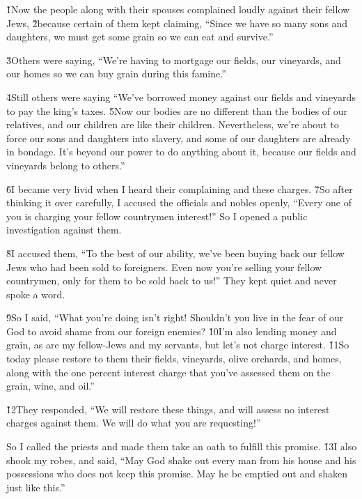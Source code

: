 \v{1}Now the people along with their spouses complained loudly against their fellow Jews, \v{2}because certain of them kept claiming, ``Since we have so many sons and daughters, we must get some grain so we can eat and survive.''

\v{3}Others were saying, ``We're having to mortgage our fields, our vineyards, and our homes so we can buy grain during this famine.''

\v{4}Still others were saying ``We've borrowed money against our fields and vineyards to pay the king's taxes. \v{5}Now our bodies are no different than the bodies of our relatives, and our children are like their children. Nevertheless, we're about to force our sons and daughters into slavery, and some of our daughters are already in bondage. It's beyond our power to do anything about it, because our fields and vineyards belong to others.''

\v{6}I became very livid when I heard their complaining and these charges. \v{7}So after thinking it over carefully, I accused the officials and nobles openly, ``Every one of you is charging your fellow countrymen interest!'' So I opened a public investigation against them.

\v{8}I accused them, ``To the best of our ability, we've been buying back our fellow Jews who had been sold to foreigners. Even now you're selling your fellow countrymen, only for them to be sold back to us!'' They kept quiet and never spoke a word.

\v{9}So I said, ``What you're doing isn't right! Shouldn't you live in the fear of our God to avoid shame from our foreign enemies? \v{10}I'm also lending money and grain, as are my fellow-Jews and my servants, but let's not charge interest. \v{11}So today please restore to them their fields, vineyards, olive orchards, and homes, along with the one percent interest charge that you've assessed them on the grain, wine, and oil.''

\v{12}They responded, ``We will restore these things, and will assess no interest charges against them. We will do what you are requesting!''

So I called the priests and made them take an oath to fulfill this promise. \v{13}I also shook my robes, and said, ``May God shake out every man from his house and his possessions who does not keep this promise. May he be emptied out and shaken just like this.''

